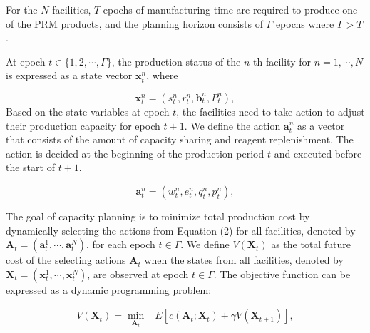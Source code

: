 \documentclass[preprint,review,12pt,nonatbib]{elsarticle}
\begin{document}
For the $N$ facilities, $T$ epochs of manufacturing time are required to produce one of the PRM products, and the planning horizon consists of $\Gamma$ epochs where $\Gamma>T$.

At epoch $t \in\{1,2, \cdots, \Gamma\}$, the production status of the $n$-th facility for $n=1, \cdots, N$ is expressed as a state vector $\mathbf{x}_{t}^{n}$, where

\begin{equation}
\mathbf{x}_{t}^{n}=\left(s_{t}^{n}, r_{t}^{n}, \mathbf{b}_{t}^{n}, P_{t}^{n}\right),
\end{equation}
Based on the state variables at epoch $t$, the facilities need to take action to adjust their production capacity for epoch $t+1$. We define the action $\mathbf{a}_{t}^{n}$ as a vector that consists of the amount of capacity sharing and reagent replenishment. The action is decided at the beginning of the production period $t$ and executed before the start of $t+1$.

\begin{equation}
\mathbf{a}_{t}^{n}=\left(w_{t}^{n}, e_{t}^{n}, q_{t}^{n}, p_{t}^{n}\right),
\end{equation}

The goal of capacity planning is to minimize total production cost by dynamically selecting the actions from Equation (2) for all facilities, denoted by $\mathbf{A}_{t}=\left(\mathbf{a}_{t}^{1}, \cdots, \mathbf{a}_{t}^{N}\right)$, for each epoch $t \in \Gamma$. We define $V\left( \mathbf{X}_{t}\right)$ as the total future cost of the selecting actions $\mathbf{A}_{t}$ when the states from all facilities, denoted by $\mathbf{X}_{t}=\left(\mathbf{x}_{t}^{1}, \cdots, \mathbf{x}_{t}^{N}\right)$, are observed at epoch $t \in \Gamma$. The objective function can be expressed as a dynamic programming problem:

\begin{equation}
\begin{array}{ll}
 V\left( \mathbf{X}_{t}\right)= 
 \min _{\mathbf{A}_{t}} & E\left[c\left(\mathbf{A}_{t} ; \mathbf{X}_{t}\right)+\gamma  V\left(\mathbf{X}_{t+1}\right)\right],
\end{array}
\end{equation}
\end{document}
